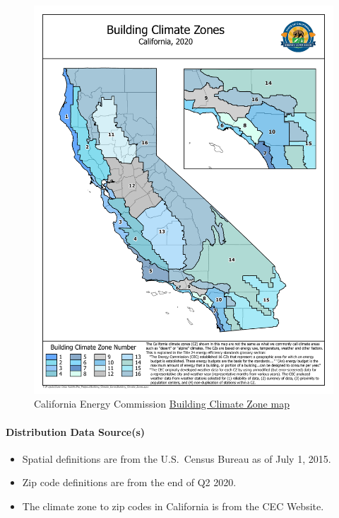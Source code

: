 \begin{figure}
    \centering
    \includegraphics[width=1\linewidth]{images/CEC_Building_Climate_Zones.pdf}
    \caption{California Energy Commission \href{https://cecgis-caenergy.opendata.arcgis.com/documents/CAEnergy::building-climate-zones/explore}{Building Climate Zone map}}
    \label{fig:cec_cz}
\end{figure}

\paragraph{Distribution Data Source(s)}
\begin{itemize}
    \item Spatial definitions are from the U.S.~Census Bureau as of July 1, 2015.
    \item Zip code definitions are from the end of Q2 2020.
    \item The climate zone to zip codes in California is from the CEC Website.
\end{itemize}

